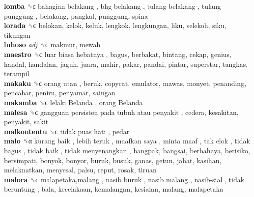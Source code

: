 \textbf{lomba} ␝ϲ   bahagian belakang ,  bhg belakang ,  tulang belakang ,  tulang punggung , belakang, pangkal, punggung, spina  \\
\textbf{lorada} ␝ϲ  belokan, kelok, keluk, lengkok, lengkungan, liku, selekoh, siku, tikungan  \\
\textbf{luhoso} \emph{adj}  ␝ϲ  makmur, mewah  \\
\textbf{maestro} ␝ϲ   luar biasa hebatnya , bagus, berbakat, bintang, cekap, genius, handal, handalan, jaguh, juara, mahir, pakar, pandai, pintar, superstar, tangkas, terampil  \\
\textbf{makaku} ␝ϲ   orang utan , beruk, copycat, emulator, mawas, monyet, penanding, pencabar, peniru, penyamar, saingan  \\
\textbf{makamba} ␝ϲ   lelaki Belanda ,  orang Belanda   \\
\textbf{malesa} ␝ϲ   gangguan persisten pada tubuh atau penyakit , cedera, kesakitan, penyakit, sakit  \\
\textbf{malkontentu} ␝ϲ   tidak puas hati , pedar  \\
\textbf{malo} ␝α   kurang baik ,  lebih teruk ,  maafkan saya ,  minta maaf ,  tak elok ,  tidak bagus ,  tidak baik ,  tidak menyenangkan , bangpak, bangsai, berbahaya, berisiko, bersimpati, bonyok, bonyor, buruk, busuk, ganas, getun, jahat, kasihan, melaknatkan, menyesal, palsu, reput, rosak, tiruan  \\
\textbf{malora} ␝ϲ   malapetaka,malang ,  nasib buruk ,  nasib malang ,  nasib-sial ,  tidak beruntung , bala, kecelakaan, kemalangan, kesialan, malang, malapetaka  \\

